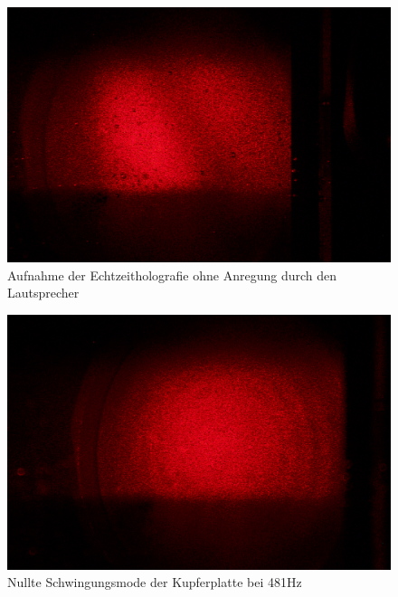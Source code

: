 \begin{figure}
 \includegraphics[width=\textwidth]{Photos/IMG_3932.png}
 \caption{Aufnahme der Echtzeitholografie ohne Anregung durch den Lautsprecher}
 \label{echtzeit_ohne_ton}
\end{figure}

\begin{figure}
 \includegraphics[width=\textwidth]{Photos/IMG_3934.png}
 \caption{Nullte Schwingungsmode der Kupferplatte bei 481Hz}
 \label{echtzeit_481}
\end{figure}


